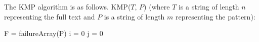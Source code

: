 \documentclass[]{article}
\theoremstyle{definition}
\begin{document}
				The KMP algorithm is as follows. KMP($T$, $P$) (where $T$ is a string of length $n$ representing the full text and $P$ is a string of length $m$ representing the pattern): \\
				\begin{algorithm}[H]
					F = failureArray(P)\;
					i = 0\;
					j = 0\;
				\end{algorithm}
\end{document}

